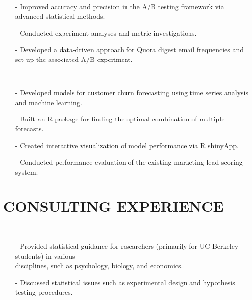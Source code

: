 \documentclass{res}
\begin{document}
\begin{resume}
     \\
    \begin{itemize}
     \item[-] Improved accuracy and precision in the A/B testing framework via advanced statistical methods.
     \item[-] Conducted experiment analyses and metric investigations.
     \item[-] Developed a data-driven approach for Quora digest email frequencies and set up the associated A/B experiment.
     \end{itemize}  
   
     \\
    \begin{itemize}
     \item[-] Developed models for customer churn forecasting using time series analysis and machine learning.
     \item[-] Built an R package for finding the optimal combination of multiple forecasts.
     \item[-] Created interactive visualization of model performance via R shinyApp.
     \item[-] Conducted performance evaluation of the existing marketing lead scoring system.
     \end{itemize}   

\section{CONSULTING EXPERIENCE}
     
     \\ 
    \begin{itemize}
     \item[-] Provided statistical guidance for researchers (primarily for UC Berkeley students) in various \\disciplines, such as psychology, biology, and economics.
     \item[-] Discussed statistical issues such as experimental design and hypothesis testing procedures.    
    \end{itemize}     


\end{resume}
\end{document}

